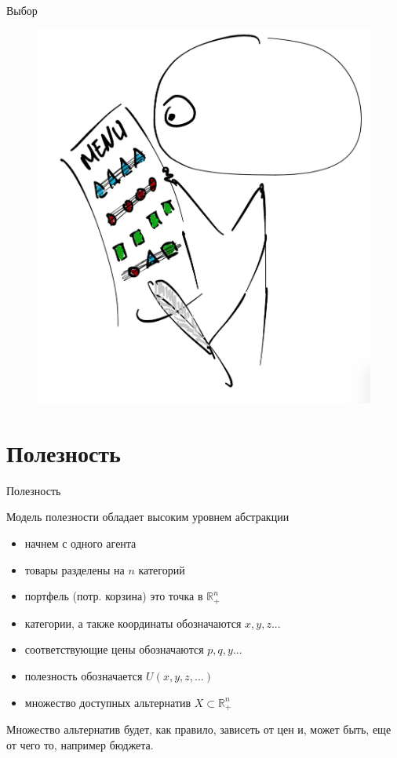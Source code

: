 \documentclass{beamer}
\begin{document}
\begin{frame}{Выбор}

\begin{figure}[hbt]
\centering
\includegraphics[width=.7 \textwidth]{pic3}
\end{figure}

\end{frame}

\section{Полезность}

\begin{frame}{Полезность}

Модель полезности обладает высоким уровнем абстракции

\begin{itemize}
\item начнем с одного агента
\item товары разделены на $n$ категорий
\item портфель (потр. корзина) это точка в $\mathbb{R}_{+}^{n}$	
\item категории, а также координаты обозначаются $x, y, z...$
\item соответствующие цены обозначаются $p, q, y...$
\item полезность обозначается $U(x,y,z, \ldots)$
\item множество доступных альтернатив $X \subset \mathbb{R}_{+}^{n}$
\end{itemize}

Множество альтернатив будет, как правило, зависеть от цен и, может быть, еще от чего то, например бюджета.


\end{frame}
\end{document}
